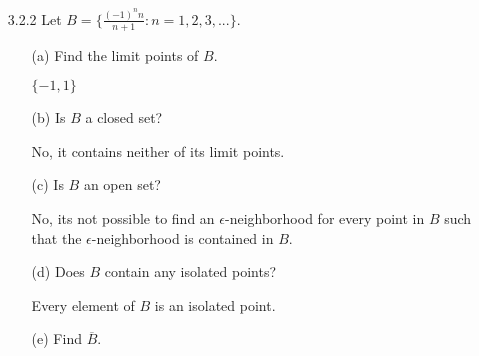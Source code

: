 \documentclass[12pt,letterpaper]{article}
\begin{document}
    \begin{itemize}[leftmargin=!,labelindent=5pt]
        \item [3.2.2] Let $B = \{\frac{(-1)^nn}{n+1} : n = 1, 2, 3, ...\}$.
            \begin{itemize}
                \item [(a)] Find the limit points of $B$.
                
                    $\{-1, 1\}$
                \item [(b)] Is $B$ a closed set?
                
                    No, it contains neither of its limit points.
                \item [(c)] Is $B$ an open set?
                
                    No, its not possible to find an $\epsilon$-neighborhood for every point in $B$ such that the $\epsilon$-neighborhood is contained in $B$.
                \item [(d)] Does $B$ contain any isolated points?
                
                    Every element of $B$ is an isolated point.
                \item [(e)] Find $\overline{B}$.
                

\end{itemize}
\end{itemize}
\end{document}
